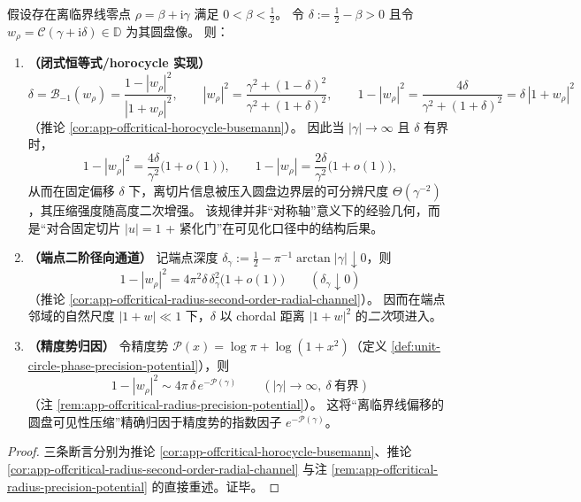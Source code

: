 \begin{theorem}[离临界线偏移的二次径向压缩律与精度势归因]\label{thm:xi-offcritical-quadratic-radial-compression}
假设存在离临界线零点 \(\rho=\beta+\mathrm{i}\gamma\) 满足 \(0<\beta<\tfrac12\)。
令
\(
\delta:=\tfrac12-\beta>0
\)
且令 \(w_\rho=\mathcal{C}(\gamma+\mathrm{i}\delta)\in\mathbb{D}\) 为其圆盘像。
则：
\begin{enumerate}
  \item \textbf{（闭式恒等式/horocycle 实现）}
  \[
  \delta=\mathcal{B}_{-1}(w_\rho)=\frac{1-|w_\rho|^2}{|1+w_\rho|^2},
  \qquad
  |w_\rho|^2=\frac{\gamma^2+(1-\delta)^2}{\gamma^2+(1+\delta)^2},
  \qquad
  1-|w_\rho|^2=\frac{4\delta}{\gamma^2+(1+\delta)^2}=\delta\,|1+w_\rho|^2
  \]
  （推论 \ref{cor:app-offcritical-horocycle-busemann}）。
  因此当 \(|\gamma|\to\infty\) 且 \(\delta\) 有界时，
  \[
  1-|w_\rho|^{2}=\frac{4\delta}{\gamma^{2}}\bigl(1+o(1)\bigr),
  \qquad
  1-|w_\rho|=\frac{2\delta}{\gamma^{2}}\bigl(1+o(1)\bigr),
  \]
  从而在固定偏移 \(\delta\) 下，离切片信息被压入圆盘边界层的可分辨尺度 \(\Theta(\gamma^{-2})\)，其压缩强度随高度二次增强。
  该规律并非“对称轴”意义下的经验几何，而是“对合固定切片 \(|u|=1\) + 紧化门”在可见化口径中的结构后果。
  \item \textbf{（端点二阶径向通道）}
  记端点深度 \(\delta_\gamma:=\tfrac12-\pi^{-1}\arctan|\gamma|\downarrow 0\)，则
  \[
  1-|w_\rho|^2
  =4\pi^2\delta\,\delta_\gamma^2\bigl(1+o(1)\bigr)\qquad(\delta_\gamma\downarrow 0)
  \]
  （推论 \ref{cor:app-offcritical-radius-second-order-radial-channel}）。
  因而在端点邻域的自然尺度 \(|1+w|\ll 1\) 下，\(\delta\) 以 chordal 距离 \(|1+w|^2\) 的\emph{二次}项进入。
  \item \textbf{（精度势归因）}
  令精度势 \(\mathcal{P}(x)=\log\pi+\log(1+x^2)\)（定义 \ref{def:unit-circle-phase-precision-potential}），则
  \[
  1-|w_\rho|^2\sim 4\pi\,\delta\,e^{-\mathcal{P}(\gamma)}\qquad(|\gamma|\to\infty,\ \delta\ \text{有界})
  \]
  （注 \ref{rem:app-offcritical-radius-precision-potential}）。
  这将“离临界线偏移的圆盘可见性压缩”精确归因于精度势的指数因子 \(e^{-\mathcal{P}(\gamma)}\)。
\end{enumerate}
\end{theorem}

\begin{proof}
三条断言分别为推论 \ref{cor:app-offcritical-horocycle-busemann}、推论 \ref{cor:app-offcritical-radius-second-order-radial-channel} 与注 \ref{rem:app-offcritical-radius-precision-potential} 的直接重述。证毕。
\end{proof}

